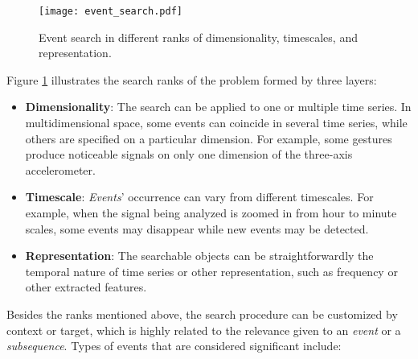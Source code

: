 \begin{figure}
    \centering
    \texttt{[image: event\_search.pdf]}
    \caption{Event search in different ranks of dimensionality, timescales, and representation.}
    \label{fig:event_search}
\end{figure}




Figure \ref{fig:event_search} illustrates the search ranks of the problem formed by three layers:

\begin{itemize}
    \item \textbf{Dimensionality}: The search can be applied to one or multiple time series. In multidimensional space, some events can coincide in several time series, while others are specified on a particular dimension. For example, some gestures produce noticeable signals on only one dimension of the three-axis accelerometer.
    \item \textbf{Timescale}: \textit{Events}' occurrence can vary from different timescales. For example, when the signal being analyzed is zoomed in from hour to minute scales, some events may disappear while new events may be detected.
    \item \textbf{Representation}: The searchable objects can be straightforwardly the temporal nature of time series or other representation, such as frequency or other extracted features.
\end{itemize}

Besides the ranks mentioned above, the search procedure can be customized by context or target, which is highly related to the relevance given to an \textit{event} or a \textit{subsequence}. Types of events that are considered significant include:

